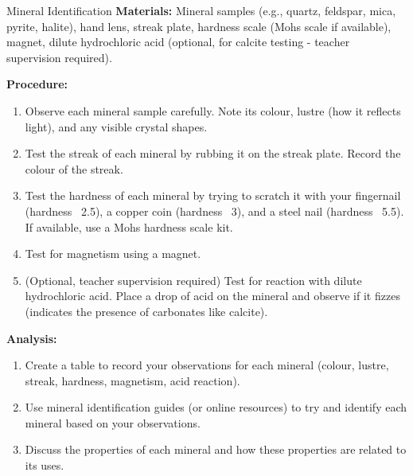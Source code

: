 \begin{investigation}{Mineral Identification}
\textbf{Materials:} Mineral samples (e.g., quartz, feldspar, mica, pyrite, halite), hand lens, streak plate, hardness scale (Mohs scale if available), magnet, dilute hydrochloric acid (optional, for calcite testing - teacher supervision required).

\textbf{Procedure:}
\begin{enumerate}
    \item Observe each mineral sample carefully. Note its colour, lustre (how it reflects light), and any visible crystal shapes.
    \item Test the streak of each mineral by rubbing it on the streak plate. Record the colour of the streak.
    \item Test the hardness of each mineral by trying to scratch it with your fingernail (hardness ~2.5), a copper coin (hardness ~3), and a steel nail (hardness ~5.5). If available, use a Mohs hardness scale kit.
    \item Test for magnetism using a magnet.
    \item (Optional, teacher supervision required) Test for reaction with dilute hydrochloric acid. Place a drop of acid on the mineral and observe if it fizzes (indicates the presence of carbonates like calcite).
\end{enumerate}

\textbf{Analysis:}
\begin{enumerate}
    \item Create a table to record your observations for each mineral (colour, lustre, streak, hardness, magnetism, acid reaction).
    \item Use mineral identification guides (or online resources) to try and identify each mineral based on your observations.
    \item Discuss the properties of each mineral and how these properties are related to its uses.
\end{enumerate}
\end{investigation}

